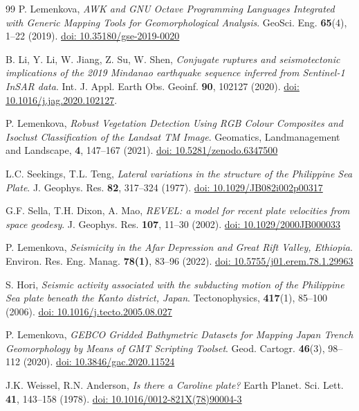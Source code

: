 \documentclass{rrparticle}
\begin{document}
\begin{thebibliography}{99}
P. Lemenkova, \emph{AWK and GNU Octave Programming Languages Integrated with Generic Mapping Tools for Geomorphological Analysis}. GeoSci. Eng. \textbf{65}(4), 1--22 (2019). \href{https://doi.org/10.35180/gse-2019-0020}{doi: 10.35180/gse-2019-0020}

 B. Li, Y. Li, W. Jiang, Z. Su, W. Shen, \emph{Conjugate ruptures and seismotectonic implications of the 2019 Mindanao earthquake sequence inferred from Sentinel-1 InSAR data}. Int. J. Appl. Earth Obs. Geoinf. \textbf{90}, 102127 (2020). \href{https://doi.org/10.1016/j.jag.2020.102127}{doi: 10.1016/j.jag.2020.102127}.

P. Lemenkova, \emph{Robust Vegetation Detection Using RGB Colour Composites and Isoclust Classification of the Landsat TM Image}. Geomatics, Landmanagement and Landscape, \textbf{4}, 147--167 (2021). \href{https://doi.org/10.5281/zenodo.6347500}{doi: 10.5281/zenodo.6347500}

 L.C. Seekings, T.L. Teng, \emph{Lateral variations in the structure of the Philippine Sea Plate}. J. Geophys. Res. \textbf{82}, 317--324 (1977). \href{https://doi.org/10.1029/JB082i002p00317}{doi: 10.1029/JB082i002p00317}

 G.F. Sella, T.H. Dixon, A. Mao, \emph{REVEL: a model for recent plate velocities from space geodesy}. J. Geophys. Res. \textbf{107}, 11--30 (2002). \href{https://doi.org/10.1029/2000JB000033}{doi: 10.1029/2000JB000033}

 P. Lemenkova, \emph{Seismicity in the Afar Depression and Great Rift Valley, Ethiopia}. Environ. Res. Eng. Manag.  \textbf{78(1)}, 83--96 (2022). \href{https://doi.org/10.5755/j01.erem.78.1.29963}{doi: 10.5755/j01.erem.78.1.29963}

 S. Hori, \emph{Seismic activity associated with the subducting motion of the Philippine Sea plate beneath the Kanto district, Japan}. Tectonophysics, \textbf{417}(1), 85--100 (2006). \href{https://doi.org/10.1016/j.tecto.2005.08.027}{doi: 10.1016/j.tecto.2005.08.027}

 P. Lemenkova, \emph{GEBCO Gridded Bathymetric Datasets for Mapping Japan Trench Geomorphology by Means of GMT Scripting Toolset}. Geod. Cartogr. \textbf{46}(3), 98--112 (2020). \href{https://doi.org/10.3846/gac.2020.11524}{doi: 10.3846/gac.2020.11524}

 J.K. Weissel, R.N. Anderson, \emph{Is there a Caroline plate?} Earth Planet. Sci. Lett. \textbf{41}, 143--158 (1978). \href{https://doi.org/10.1016/0012-821X(78)90004-3}{doi: 10.1016/0012-821X(78)90004-3}


\end{thebibliography}
\end{document}
